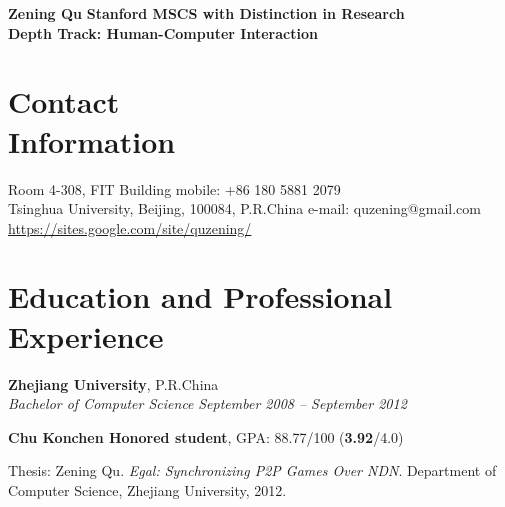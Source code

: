 \documentclass[margin,line]{resume}
\begin{document}
\hspace{-2.5cm} \textbf{\Large Zening Qu}
\hfill
\textbf{Stanford MSCS with Distinction in Research}\\ 
\vspace{0mm}
\hfill \textbf{Depth Track: Human-Computer Interaction}


\begin{resume}

    \section{\mysidestyle Contact\\Information}

    Room 4-308, FIT Building                       
    \hfill mobile: +86 180 5881 2079         \vspace{0mm}\\\vspace{0mm}%
    Tsinghua University, Beijing, 100084, P.R.China                         
    \hfill e-mail: quzening@gmail.com          
    \vspace{0mm} \\ \vspace{0mm}
    \hfill 
    \href{https://sites.google.com/site/quzening/}{\url{https://sites.google.com/site/quzening/}}

    \section{\mysidestyle Education and Professional Experience}

    \textbf{Zhejiang University}, P.R.China \vspace{2mm}\\\vspace{1mm}%
    \textsl{Bachelor of Computer Science} \hfill \textsl{September 2008 -- September 2012}\vspace{-3mm}\\\vspace{-1mm}%
    \begin{list2}
        \item \textbf{Chu Konchen Honored student}, GPA: 88.77/100 (\textbf{3.92}/4.0)
        \item Thesis: Zening Qu. \textsl{Egal: Synchronizing P2P Games Over NDN}. Department of Computer Science, Zhejiang University, 2012.
    \end{list2}\vspace{-1.5mm}
    

\end{resume}
\end{document}
